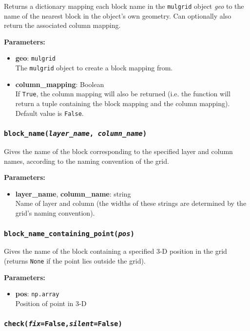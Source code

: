 Returns a dictionary mapping each block name in the \texttt{mulgrid} object \emph{geo} to the name of the nearest block in the object's own geometry.  Can optionally also return the associated column mapping.

\textbf{Parameters:}
\begin{itemize}
\item \textbf{geo}: \texttt{mulgrid}\\
  The \texttt{mulgrid} object to create a block mapping from.
\item \textbf{column\_mapping}: Boolean\\
  If \texttt{True}, the column mapping will also be returned (i.e. the function will return a tuple containing the block mapping and the column mapping).  Default value is \texttt{False}.
\end{itemize}

\subsubsection{\texttt{block\_name(\emph{layer\_name}, \emph{column\_name})}}

Gives the name of the block corresponding to the specified layer and column names, according to the naming convention of the grid.

\textbf{Parameters:}
\begin{itemize}
\item \textbf{layer\_name}, \textbf{column\_name}: string\\
  Name of layer and column (the widths of these strings are determined by the grid's naming convention).
\end{itemize}

\subsubsection{\texttt{block\_name\_containing\_point(\emph{pos})}}

Gives the name of the block containing a specified 3-D position in the grid (returns \texttt{None} if the point lies outside the grid).

\textbf{Parameters:}
\begin{itemize}
\item \textbf{pos}: \texttt{np.array}\\
  Position of point in 3-D
\end{itemize}

\subsubsection{\texttt{check(\emph{fix}=False,\emph{silent}=False)}}

